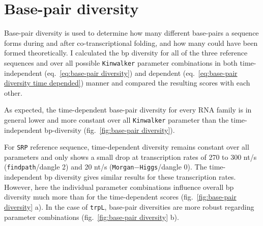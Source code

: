 \documentclass[ twoside,openright,titlepage,numbers=noenddot,headinclude,%
                footinclude=false, cleardoublepage=empty,abstractoff, %
                BCOR=5mm,paper=a4,fontsize=11pt,%
                ngerman,american,%
                ]{scrreprt}
\begin{document}
\FloatBarrier
		





\FloatBarrier
		

\section{Base-pair diversity}
  
Base-pair diversity is used to determine how many different base-pairs a
sequence forms during and after co-transcriptional folding, and how many
could have been formed theoretically.
I calculated the bp diversity for all of the three 
reference sequences and over all possible \texttt{Kinwalker} parameter
combinations in both time-independent (eq.~\ref{eq:base-pair diversity})
and dependent (eq.~\ref{eq:base-pair diversity time depended}) manner
 and compared the resulting scores with each other. 

As expected, the time-dependent base-pair diversity for every RNA family is in general lower and more constant over all \texttt{Kinwalker} parameter than the time-independent bp-diversity (fig.~\ref{fig:base-pair diversity}).

For \texttt{SRP} reference sequence,  time-dependent diversity remains constant over
all parameters and only shows a small drop at transcription rates of 270 to 300
nt/s (\texttt{findpath}/dangle 2) and 20 nt/s (\texttt{Morgan$-$Higgs}/dangle
$0$). The time-independent bp diversity gives similar results for these
transcription rates. However, here the individual parameter combinations
influence overall bp diversity much more than for the time-dependent scores
(fig.~\ref{fig:base-pair diversity} a).
In the case of \texttt{trpL}, base-pair diversities are more robust regarding parameter
combinations (fig.~\ref{fig:base-pair diversity} b).
\end{document}

